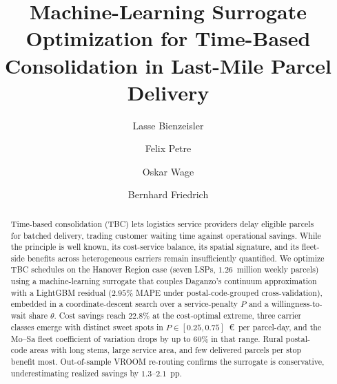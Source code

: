 \documentclass[preprint,12pt,authoryear]{elsarticle}
\begin{document}
\begin{frontmatter} 


\title{Machine-Learning Surrogate Optimization for Time-Based Consolidation in Last-Mile Parcel Delivery}




\author[a]{Lasse Bienzeisler}
\author[a]{Felix Petre}
\author[b]{Oskar Wage}
\author[a]{Bernhard Friedrich}


\address[a]{Institute of Transportation and Urban Engineering, TU Braunschweig, Hermann-Blenk-Straße 42, 38108 Braunschweig, Germany}
\address[b]{Institute of Cartography and Geoinformatics, Leibniz University Hannover, Appelstraße 9a, 30167 Hannover, Germany}

\begin{abstract}
Time-based consolidation (TBC) lets logistics service providers delay eligible parcels for batched delivery, trading customer waiting time against operational savings. While the principle is well known, its cost-service balance, its spatial signature, and its fleet-side benefits across heterogeneous carriers remain insufficiently quantified. We optimize TBC schedules on the Hanover Region case (seven LSPs, $1.26$~million weekly parcels) using a machine-learning surrogate that couples Daganzo's continuum approximation with a LightGBM residual ($2.95\%$ MAPE under postal-code-grouped cross-validation), embedded in a coordinate-descent search over a service-penalty $P$ and a willingness-to-wait share $\theta$. Cost savings reach $22.8\%$ at the cost-optimal extreme, three carrier classes emerge with distinct sweet spots in $P \in [0.25, 0.75]$~\euro\ per parcel-day, and the Mo--Sa fleet coefficient of variation drops by up to $60\%$ in that range. Rural postal-code areas with long stems, large service area, and few delivered parcels per stop benefit most. Out-of-sample VROOM re-routing confirms the surrogate is conservative, underestimating realized savings by $1.3$--$2.1$~pp.








\end{abstract}
\end{frontmatter}
\end{document}
